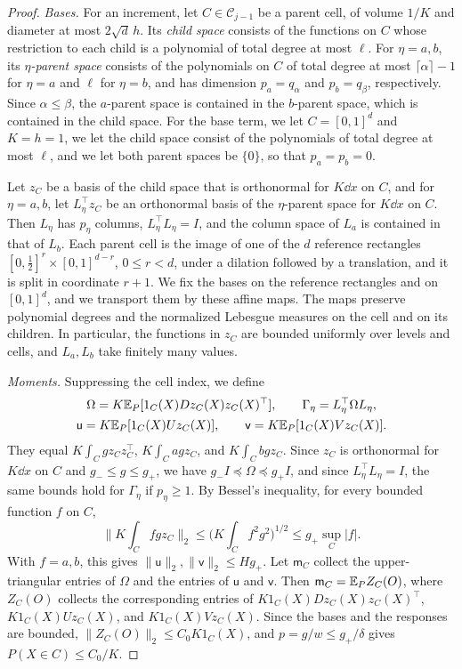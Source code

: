 \begin{proof}
\emph{Bases.} For an increment, let $C\in\mathcal C_{j-1}$ be a parent
cell, of volume $1/K$ and diameter at most $2\sqrt d\,h$. Its \emph{child
space} consists of the functions on $C$ whose restriction to each child is
a polynomial of total degree at most $\ell$. For $\eta=a,b$, its
\emph{$\eta$-parent space} consists of the polynomials on $C$ of total
degree at most $\lceil\alpha\rceil-1$ for $\eta=a$ and $\ell$ for
$\eta=b$, and has dimension $p_a=q_\alpha$ and $p_b=q_\beta$,
respectively. Since $\alpha\le\beta$, the $a$-parent space is contained in
the $b$-parent space, which is contained in the child space. For the base
term, we let $C=[0,1]^d$ and $K=h=1$, we let the child space consist of
the polynomials of total degree at most $\ell$, and we let both parent
spaces be $\{0\}$, so that $p_a=p_b=0$.

Let $z_C$ be a basis of the child space that is orthonormal for $K\dd x$ on
$C$, and for $\eta=a,b$, let $L_\eta^\top z_C$ be an orthonormal basis of
the $\eta$-parent space for $K\dd x$ on $C$. Then $L_\eta$ has $p_\eta$
columns, $L_\eta^\top L_\eta=I$, and the column space of $L_a$ is contained
in that of $L_b$. Each parent cell is the image of one of the $d$ reference
rectangles $[0,\frac12]^r\times[0,1]^{d-r}$, $0\le r<d$, under a dilation
followed by a translation, and it is split in coordinate $r+1$. We fix the
bases on the reference rectangles and on $[0,1]^d$, and we transport them
by these affine maps. The maps preserve polynomial degrees and the
normalized Lebesgue measures on the cell and on its children. In
particular, the
functions in $z_C$ are bounded uniformly over levels and cells, and
$L_a,L_b$ take finitely many values.

\emph{Moments.} Suppressing the cell index, we define
\begin{equation}\label{eq:main-moments}
 \begin{gathered}
 \Omega=K\mathbb E_P[1_C(X)Dz_C(X)z_C(X)^\top],\qquad
 \Gamma_\eta=L_\eta^\top\Omega L_\eta,\\
 \mathsf u=K\mathbb E_P[1_C(X)Uz_C(X)],\qquad \mathsf v=K\mathbb E_P[1_C(X)Vz_C(X)].
 \end{gathered}
\end{equation}
They equal $K\int_Cgz_Cz_C^\top$, $K\int_Cagz_C$, and $K\int_Cbgz_C$.
Since $z_C$ is orthonormal for $K\dd x$ on $C$ and $g_-\le g\le g_+$, we
have $g_-I\preceq\Omega\preceq g_+I$, and since $L_\eta^\top L_\eta=I$, the
same bounds hold for $\Gamma_\eta$ if $p_\eta\ge1$. By Bessel's inequality,
for every bounded function $f$ on $C$,
\begin{equation}\label{eq:bessel-moment}
 \Big\|K\int_Cfgz_C\Big\|_2\le\Big(K\int_Cf^2g^2\Big)^{1/2}
 \le g_+\sup_C|f|.
\end{equation}
With $f=a,b$, this gives $\|\mathsf u\|_2,\|\mathsf v\|_2\le Hg_+$. Let
$\mathsf m_C$ collect the upper-triangular entries of $\Omega$ and the
entries of $\mathsf u$ and $\mathsf v$. Then $\mathsf m_C=\mathbb E_PZ_C(O)$, where
$Z_C(O)$ collects the corresponding entries of
$K1_C(X)Dz_C(X)z_C(X)^\top$, $K1_C(X)Uz_C(X)$, and $K1_C(X)Vz_C(X)$. Since
the bases and the responses are bounded, $\|Z_C(O)\|_2\le C_0K1_C(X)$,
and $p=g/w\le g_+/\delta$ gives $P(X\in C)\le C_0/K$.


\end{proof}
